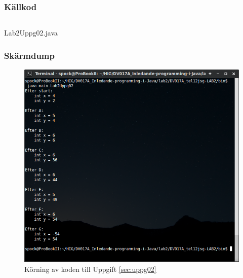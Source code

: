 \subsubsection{Källkod}
\inputminted[linenos]{java}{src/Lab2Uppg02.java}
\caption{Lab2Uppg02.java}
\label{src:uppg02}


\subsubsection{Skärmdump}
\begin{figure}[htbp]
    \centering
        \includegraphics[width=\linewidth]{img/02.png}
    \caption{Körning av koden till Uppgift \ref{sec:uppg02}}
    \label{fig:uppg02-screenshot}
\end{figure}

